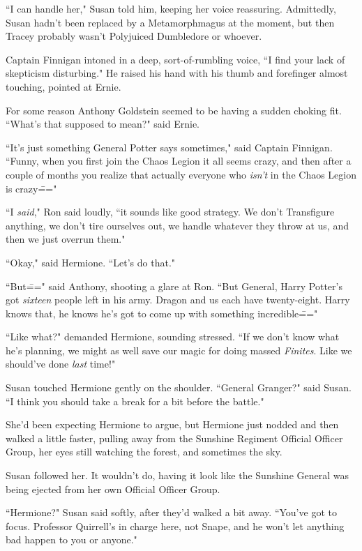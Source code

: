 ``I can handle her," Susan told him, keeping her voice reassuring. Admittedly, Susan hadn't been replaced by a Metamorphmagus at the moment, but then Tracey probably wasn't Polyjuiced Dumbledore or whoever.

Captain Finnigan intoned in a deep, sort-of-rumbling voice, ``I find your lack of skepticism disturbing." He raised his hand with his thumb and forefinger almost touching, pointed at Ernie.

For some reason Anthony Goldstein seemed to be having a sudden choking fit. ``What's that supposed to mean?" said Ernie.

``It's just something General Potter says sometimes," said Captain Finnigan. ``Funny, when you first join the Chaos Legion it all seems crazy, and then after a couple of months you realize that actually everyone who \emph{isn't} in the Chaos Legion is crazy\==="

``I \emph{said}," Ron said loudly, ``it sounds like good strategy. We don't Transfigure anything, we don't tire ourselves out, we handle whatever they throw at us, and then we just overrun them."

``Okay," said Hermione. ``Let's do that."

``But\===" said Anthony, shooting a glare at Ron. ``But General, Harry Potter's got \emph{sixteen} people left in his army. Dragon and us each have twenty-eight. Harry knows that, he knows he's got to come up with something incredible\==="

``Like what?" demanded Hermione, sounding stressed. ``If we don't know what he's planning, we might as well save our magic for doing massed \emph{Finites}. Like we should've done \emph{last} time!"

Susan touched Hermione gently on the shoulder. ``General Granger?" said Susan. ``I think you should take a break for a bit before the battle."

She'd been expecting Hermione to argue, but Hermione just nodded and then walked a little faster, pulling away from the Sunshine Regiment Official Officer Group, her eyes still watching the forest, and sometimes the sky.

Susan followed her. It wouldn't do, having it look like the Sunshine General was being ejected from her own Official Officer Group.

``Hermione?" Susan said softly, after they'd walked a bit away. ``You've got to focus. Professor Quirrell's in charge here, not Snape, and he won't let anything bad happen to you or anyone."

